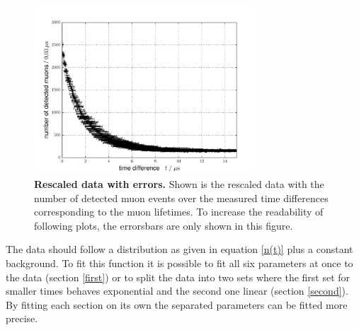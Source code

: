 \documentclass{include/thesisclass3}
\begin{document}
\begin{figure}[H]
	\begin{center}
		\includegraphics[width=0.75\textwidth]{images/errors.pdf}
		\caption{\label{raw}\textbf{Rescaled data with errors.} Shown is the rescaled data with the number of detected muon events over the measured time differences corresponding to the muon lifetimes. To increase the readability of following plots, the errorsbars are only shown in this figure.}
	\end{center}
\end{figure}
The data should follow a distribution as given in equation \ref{n(t)} plus a constant background. 
To fit this function it is possible to fit all six parameters at once to the data (section \ref{first}) or to split the data into two sets where the first set for smaller times behaves exponential and the second one linear (section \ref{second}). By fitting each section on its own the separated parameters can be fitted more precise. 
\end{document}
